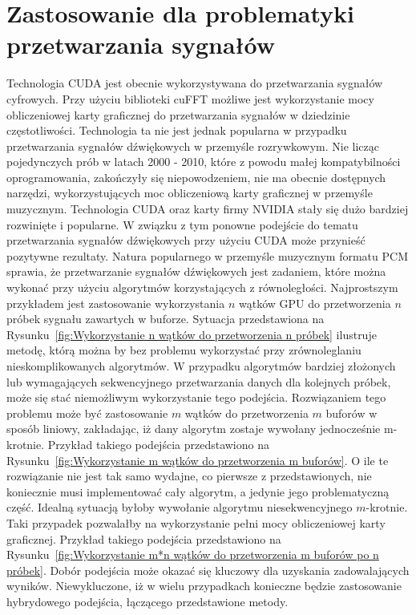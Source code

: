 \section{Zastosowanie dla problematyki przetwarzania sygnałów}
Technologia CUDA jest obecnie wykorzystywana do przetwarzania sygnałów cyfrowych. Przy użyciu biblioteki cuFFT możliwe jest wykorzystanie mocy obliczeniowej karty graficznej do przetwarzania sygnałów w dziedzinie częstotliwości. Technologia ta nie jest jednak popularna w przypadku przetwarzania sygnałów dźwiękowych w przemyśle rozrywkowym. Nie licząc pojedynczych prób w latach 2000 - 2010, które z powodu małej kompatybilności oprogramowania, zakończyły się niepowodzeniem, nie ma obecnie dostępnych narzędzi, wykorzystujących moc obliczeniową karty graficznej w przemyśle muzycznym. Technologia CUDA oraz karty firmy NVIDIA stały się dużo bardziej rozwinięte i popularne. W związku z tym ponowne podejście do tematu przetwarzania sygnałów dźwiękowych przy użyciu CUDA może przynieść pozytywne rezultaty. Natura popularnego w przemyśle muzycznym formatu PCM sprawia, że przetwarzanie sygnałów dźwiękowych jest zadaniem, które można wykonać przy użyciu algorytmów korzystających z równoległości. Najprostszym przykładem jest zastosowanie wykorzystania $n$ wątków GPU do przetworzenia $n$ próbek sygnału zawartych w buforze. Sytuacja przedstawiona na Rysunku~\ref{fig:Wykorzystanie n wątków do przetworzenia n próbek} ilustruje metodę, którą można by bez problemu wykorzystać przy zrównoleglaniu nieskomplikowanych algorytmów. W przypadku algorytmów bardziej złożonych lub wymagających sekwencyjnego przetwarzania danych dla kolejnych próbek, może się stać niemożliwym wykorzystanie tego podejścia. Rozwiązaniem tego problemu może być zastosowanie $m$ wątków do przetworzenia $m$ buforów w sposób liniowy, zakładając, iż dany algorytm zostaje wywołany jednocześnie m-krotnie. Przykład takiego podejścia przedstawiono na Rysunku~\ref{fig:Wykorzystanie m wątków do przetworzenia m buforów}. O ile te rozwiązanie nie jest tak samo wydajne, co pierwsze z przedstawionych, nie koniecznie musi implementować cały algorytm, a jedynie jego problematyczną część. Idealną sytuacją byłoby wywołanie algorytmu niesekwencyjnego $m$-krotnie. Taki przypadek pozwalałby na wykorzystanie pełni mocy obliczeniowej karty graficznej. Przykład takiego podejścia przedstawiono na Rysunku~\ref{fig:Wykorzystanie m*n wątków do przetworzenia m buforów po n próbek}. Dobór podejścia może okazać się kluczowy dla uzyskania zadowalających wyników. Niewykluczone, iż w wielu przypadkach konieczne będzie zastosowanie hybrydowego podejścia, łączącego przedstawione metody.

